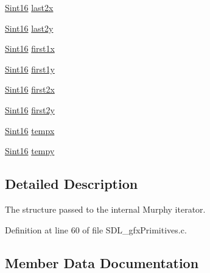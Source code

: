\begin{DoxyCompactItemize}
\item 
\hyperlink{_s_d_l__stdinc_8h_a9d0257032c0e146ab6121bf0122712f5}{Sint16} \hyperlink{struct_s_d_l__gfx_murphy_iterator_a7949ff7cc6d940a87979e750373ac4a9}{last2x}
\item 
\hyperlink{_s_d_l__stdinc_8h_a9d0257032c0e146ab6121bf0122712f5}{Sint16} \hyperlink{struct_s_d_l__gfx_murphy_iterator_a812d1048b7ccf164323a7fca19ac4057}{last2y}
\item 
\hyperlink{_s_d_l__stdinc_8h_a9d0257032c0e146ab6121bf0122712f5}{Sint16} \hyperlink{struct_s_d_l__gfx_murphy_iterator_a7fe231e388ca94977506000c39e18820}{first1x}
\item 
\hyperlink{_s_d_l__stdinc_8h_a9d0257032c0e146ab6121bf0122712f5}{Sint16} \hyperlink{struct_s_d_l__gfx_murphy_iterator_a8cef51d9d2bbb106e59080955e6b42ef}{first1y}
\item 
\hyperlink{_s_d_l__stdinc_8h_a9d0257032c0e146ab6121bf0122712f5}{Sint16} \hyperlink{struct_s_d_l__gfx_murphy_iterator_a6556b6e1f3c89bd23118eae375ca06e3}{first2x}
\item 
\hyperlink{_s_d_l__stdinc_8h_a9d0257032c0e146ab6121bf0122712f5}{Sint16} \hyperlink{struct_s_d_l__gfx_murphy_iterator_ab94325647b406d92ca58fab9d790477d}{first2y}
\item 
\hyperlink{_s_d_l__stdinc_8h_a9d0257032c0e146ab6121bf0122712f5}{Sint16} \hyperlink{struct_s_d_l__gfx_murphy_iterator_a740ae5d3e6bb0f8305bf810461e04731}{tempx}
\item 
\hyperlink{_s_d_l__stdinc_8h_a9d0257032c0e146ab6121bf0122712f5}{Sint16} \hyperlink{struct_s_d_l__gfx_murphy_iterator_a03345ad1012f407aad9710faed82c8ab}{tempy}
\end{DoxyCompactItemize}


\subsection{Detailed Description}
The structure passed to the internal Murphy iterator. 

Definition at line 60 of file S\+D\+L\+\_\+gfx\+Primitives.\+c.



\subsection{Member Data Documentation}
\hypertarget{struct_s_d_l__gfx_murphy_iterator_add81cc0a301e921f0f48c163871c44db}{}
